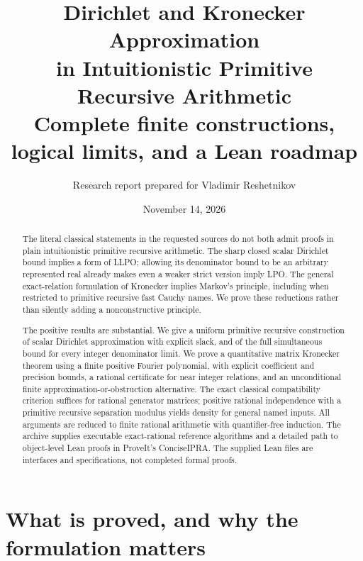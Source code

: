 \documentclass[11pt]{article}
\title{Dirichlet and Kronecker Approximation\protect\\in Intuitionistic Primitive Recursive Arithmetic\protect\\[5pt]\large Complete finite constructions, logical limits, and a Lean roadmap}
\author{Research report prepared for Vladimir Reshetnikov}
\date{November 14, 2026}
\theoremstyle{definition}\newtheorem{definition}[theorem]{Definition}
\theoremstyle{remark}\newtheorem{remark}[theorem]{Remark}
\begin{document}
\maketitle
\begin{abstract}
The literal classical statements in the requested sources do not both admit proofs in plain intuitionistic primitive recursive arithmetic. The sharp closed scalar Dirichlet bound implies a form of LLPO; allowing its denominator bound to be an arbitrary represented real already makes even a weaker strict version imply LPO. The general exact-relation formulation of Kronecker implies Markov's principle, including when restricted to primitive recursive fast Cauchy names. We prove these reductions rather than silently adding a nonconstructive principle.

The positive results are substantial. We give a uniform primitive recursive construction of scalar Dirichlet approximation with explicit slack, and of the full simultaneous bound for every integer denominator limit. We prove a quantitative matrix Kronecker theorem using a finite positive Fourier polynomial, with explicit coefficient and precision bounds, a rational certificate for near integer relations, and an unconditional finite approximation-or-obstruction alternative. The exact classical compatibility criterion suffices for rational generator matrices; positive rational independence with a primitive recursive separation modulus yields density for general named inputs. All arguments are reduced to finite rational arithmetic with quantifier-free induction. The archive supplies executable exact-rational reference algorithms and a detailed path to object-level Lean proofs in ProveIt's ConciseIPRA. The supplied Lean files are interfaces and specifications, not completed formal proofs.
\end{abstract}
\clearpage
{\small\tableofcontents}
\clearpage

\section{What is proved, and why the formulation matters}
\end{document}
